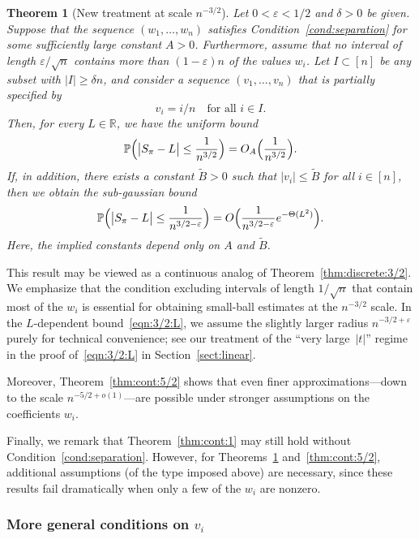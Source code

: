 \documentclass[reqno]{amsart}
\newcommand\R{{\mathbb{R}}}
\renewcommand\P{{\mathbb{P}}}
\newcommand\eps{{\varepsilon}}
\theoremstyle{plain}
\newtheorem{theorem}{Theorem}[section]
\theoremstyle{definition}
\begin{document}
\begin{theorem}[New treatment at scale $n^{-3/2}$]\label{thm:cont:3/2}
Let $0<\varepsilon<1/2$ and $\delta>0$ be given. Suppose that the sequence
$(w_1,\ldots,w_n)$ satisfies Condition~\ref{cond:separation} for some
sufficiently large constant $A>0$. Furthermore, assume that no interval of
length $\varepsilon/\sqrt{n}$ contains more than $(1-\varepsilon)n$ of the
values $w_i$. Let $I\subset[n]$ be any subset with $|I|\ge \delta n$, and
consider a sequence $(v_1,\ldots,v_n)$ that is partially specified by
\[
v_i = i/n \quad \text{for all } i\in I.
\]
Then, for every $L\in\R$, we have the uniform bound
\begin{equation}\label{eqn:3/2:u}
\P\Bigl(\bigl|S_{\pi}-L\bigr|\le \frac{1}{n^{3/2}}\Bigr)
= O_{A}\Big(\frac{1}{n^{3/2}}\Big).
\end{equation}
If, in addition, there exists a constant $\widetilde{B}>0$ such that
$|v_i|\le \widetilde{B}$ for all $i\in[n]$, then we obtain the sub-gaussian bound
\begin{equation}\label{eqn:3/2:L}
\P\Bigl(\bigl|S_{\pi}-L\bigr|\le \frac{1}{n^{3/2-\eps}}\Bigr)
= O\Big(\frac{1}{n^{3/2-\eps}} e^{-\Theta(L^{2})}\Big).
\end{equation}
Here, the implied constants depend only on $A$ and $\widetilde{B}$.
\end{theorem}

This result may be viewed as a continuous analog of
Theorem~\ref{thm:discrete:3/2}. We emphasize that the condition excluding
intervals of length $1/\sqrt{n}$ that contain most of the $w_i$ is essential
for obtaining small-ball estimates at the $n^{-3/2}$ scale. In the
$L$-dependent bound~\eqref{eqn:3/2:L}, we assume the slightly larger radius
$n^{-3/2+\varepsilon}$ purely for technical convenience; see our treatment of
the ``very large~$|t|$'' regime in the proof of~\eqref{eqn:3/2:L} in
Section~\ref{sect:linear}.

Moreover, Theorem~\ref{thm:cont:5/2} shows that even finer approximations—down
to the scale $n^{-5/2+o(1)}$—are possible under stronger assumptions on the
coefficients $w_i$.

Finally, we remark that Theorem~\ref{thm:cont:1} may still hold without
Condition~\ref{cond:separation}. However, for
Theorems~\ref{thm:cont:3/2} and~\ref{thm:cont:5/2}, additional assumptions (of
the type imposed above) are necessary, since these results fail dramatically
when only a few of the $w_i$ are nonzero.
 
\subsubsection{More general conditions on $v_i$}
\end{document}
